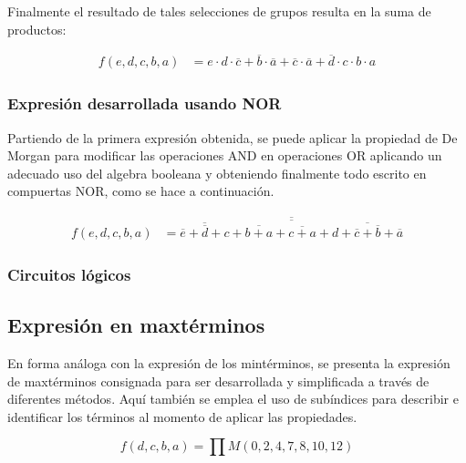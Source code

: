 Finalmente el resultado de tales selecciones de grupos resulta en la suma de productos:

\begin{equation*}
\begin{align*}
f(e,d,c,b,a) & = {e \cdot d \cdot \overline{c}}
+ {\overline{b} \cdot \overline{a}}
+ {\overline{c} \cdot \overline{a}}
+ {\overline{d} \cdot c \cdot b \cdot a}
\end{align*}
\end{equation*}

\subsubsection{Expresión desarrollada usando NOR}
Partiendo de la primera expresi\'on obtenida, se puede aplicar la propiedad de De Morgan para modificar las operaciones AND en operaciones OR
aplicando un adecuado uso del algebra booleana y obteniendo finalmente todo escrito en compuertas NOR,
como se hace a continuaci\'on.

\begin{equation*}
\begin{align*}
f(e,d,c,b,a) & = \overline{
    \overline{
            \overline{\overline{e} + \overline{d} + c}
            + \overline{b + a}
            + \overline{c + a}
            + \overline{d + \overline{c} + \overline{b} + \overline{a}}
            }
    }
\end{align*}
\end{equation*}

\subsubsection{Circuitos lógicos}

\subsection{Expresi\'on en maxt\'erminos}
En forma an\'aloga con la expresi\'on de los mint\'erminos, se presenta la expresi\'on de maxt\'erminos consignada para ser
desarrollada y simplificada a trav\'es de diferentes m\'etodos. Aqu\'i tambi\'en se emplea el uso de sub\'indices para describir
e identificar los t\'erminos al momento de aplicar las propiedades.

\begin{equation*}
    f(d,c,b,a) = \prod M(0,2,4,7,8,10,12)
\end{equation*}

